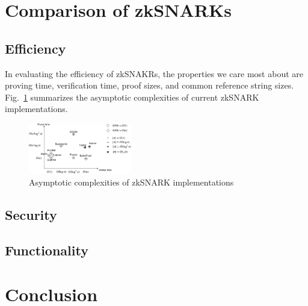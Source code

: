 \documentclass[acmtog]{acmart}
\begin{document}
\section{Comparison of zkSNARKs}

\subsection{Efficiency}

In evaluating the efficiency of zkSNAKRs, the properties we care most about are proving time, verification time, proof sizes, and common reference string sizes.
Fig.~\ref{fig:snark.sizes} summarizes the asymptotic complexities of current zkSNARK implementations.
\begin{figure}[ht!]
\includegraphics[width=0.4\textwidth]{images/snark-sizes.pdf}
\caption{Asymptotic complexities of zkSNARK implementations}
\label{fig:snark.sizes}
\Description{}
\end{figure}

\subsection{Security}

\subsection{Functionality}

\section{Conclusion}



\end{document}
